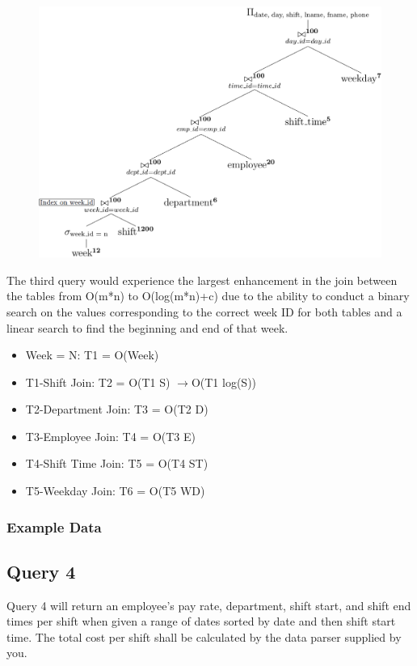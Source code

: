 \documentclass[letter,12pt]{texMemo}
\begin{document}
\begin{figure}[H]
	\centering
	\includegraphics[width=.6\textwidth]{query3_indexed.png}
\end{figure}
The third query would experience the largest enhancement in the join between the tables from O(m*n) to O(log(m*n)+c) due to the ability to conduct a binary search on the values corresponding to the correct week ID for both tables and a linear search to find the beginning and end of that week.
\begin{itemize}[noitemsep,nolistsep]
	\item Week = N: T1 = O(Week)
	\item T1-Shift Join: T2 = O(T1 S) $\rightarrow$O(T1 log(S)) 
	\item T2-Department Join: T3 = O(T2 D)
	\item T3-Employee Join: T4 = O(T3 E)
	\item T4-Shift Time Join: T5 = O(T4 ST)
	\item T5-Weekday Join: T6 = O(T5 WD)
\end{itemize}

\vspace{1em}
\subsubsection*{Example Data}
\lstset{style=smallstyle}
	\begin{center}
		
	\end{center}
\lstset{style=mystyle}

\subsection*{Query 4}
Query 4 will return an employee's pay rate, department, shift start, and shift end times per shift when given a range of dates sorted by date and then shift start time. The total cost per shift shall be calculated by the data parser supplied by you.
\end{document}
